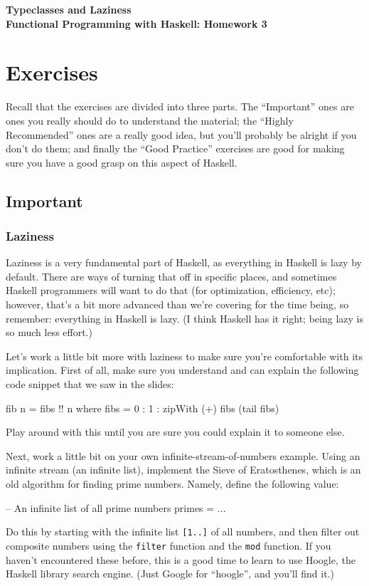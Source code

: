 \documentclass{article}
\begin{document}
\begin{center}
    \bf 
    {\Large Typeclasses and Laziness} \\[1em]
    {\large Functional Programming with Haskell: Homework 3}
\end{center}

\section*{Exercises}

Recall that the exercises are divided into three parts. The ``Important'' ones are ones you really
should do to understand the material; the ``Highly Recommended'' ones are a really good idea, but
you'll probably be alright if you don't do them; and finally the ``Good Practice'' exercises are
good for making sure you have a good grasp on this aspect of Haskell. 

\subsection*{Important}

\subsubsection*{Laziness}
Laziness is a very fundamental part of Haskell, as everything in Haskell is lazy by default. There
are ways of turning that off in specific places, and sometimes Haskell programmers will want to do
that (for optimization, efficiency, etc); however, that's a bit more advanced than we're covering
for the time being, so remember: everything in Haskell is lazy. (I think Haskell has it right; being
lazy is so much less effort.)

Let's work a little bit more with laziness to make sure you're comfortable with its implication.
First of all, make sure you understand and can explain the following code snippet that we saw in the
slides:
\begin{haskellcode}
fib n = fibs !! n
  where
    fibs = 0 : 1 : zipWith (+) fibs (tail fibs)
\end{haskellcode}
Play around with this until you are sure you could explain it to someone else.

Next, work a little bit on your own infinite-stream-of-numbers example. Using an infinite stream
(an infinite list), implement the Sieve of Eratosthenes, which is an old algorithm for finding prime
numbers. Namely, define the following value:
\begin{haskellcode}
-- An infinite list of all prime numbers
primes = ...
\end{haskellcode}
Do this by starting with the infinite list \texttt{[1..]} of all numbers, and then filter out
composite numbers using the \texttt{filter} function and the \texttt{mod} function. If you haven't
encountered these before, this is a good time to learn to use Hoogle, the Haskell library search
engine. (Just Google for ``hoogle'', and you'll find it.)
\end{document}
